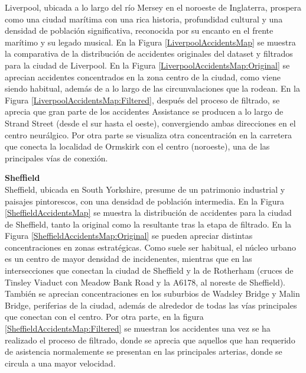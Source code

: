 \documentclass{uathesis-es}
\begin{document}
{	Liverpool, ubicada a lo largo del río Mersey en el noroeste de Inglaterra, prospera como una ciudad marítima con una rica historia, profundidad cultural y una densidad de población significativa, reconocida por su encanto en el frente marítimo y su legado musical. En la Figura \ref{LiverpoolAccidentsMap} se muestra la comparativa de la distribución de accidentes originales del dataset y filtrados para la ciudad de Liverpool. En la Figura \ref{LiverpoolAccidentsMap:Original} se aprecian accidentes concentrados en la zona centro de la ciudad, como viene siendo habitual, además de a lo largo de las circunvalaciones que la rodean. En la Figura \ref{LiverpoolAccidentsMap:Filtered}, después del proceso de filtrado, se aprecia que gran parte de los accidentes Assistance se producen a lo largo de Strand Street (desde el sur hasta el oeste), convergiendo ambas direcciones en el centro neurálgico. Por otra parte se visualiza otra concentración en la carretera que conecta la localidad de Ormskirk con el centro (noroeste), una de las principales vías de conexión.
	
	
	
	
	\textbf{Sheffield}\\
	
	Sheffield, ubicada en South Yorkshire, presume de un patrimonio industrial y paisajes pintorescos, con una densidad de población intermedia. En la Figura \ref{SheffieldAccidentsMap} se muestra la distribución de accidentes para la ciudad de Sheffield, tanto la original como la resultante tras la etapa de filtrado. En la Figura \ref{SheffieldAccidentsMap:Original} se pueden apreciar distintas concentraciones en zonas estratégicas. Como suele ser habitual, el núcleo urbano es un centro de mayor densidad de incidenentes, mientras que en las intersecciones que conectan la ciudad de Sheffield y la de Rotherham (cruces de Tinsley Viaduct con Meadow Bank Road y la A6178, al noreste de Sheffield). También se aprecian concentraciones en los suburbios de Wadsley Bridge y Malin Bridge, periferias de la ciudad, además de alrededor de todas las vías principales que conectan con el centro. Por otra parte, en la figura \ref{SheffieldAccidentsMap:Filtered} se muestran los accidentes una vez se ha realizado el proceso de filtrado, donde se aprecia que aquellos que han requerido de asistencia normalemente se presentan en las principales arterias, donde se circula a una mayor velocidad.
	
}
\end{document}
